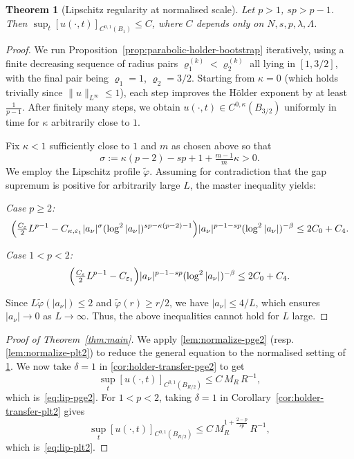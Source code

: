 \documentclass[11pt, a4paper, twoside]{article}
\newtheorem{theorem}{Theorem}[section]
\theoremstyle{definition}
\theoremstyle{remark}
\begin{document}
\begin{theorem}[Lipschitz regularity at normalised scale]
\label{thm:parabolic-lipschitz}
Let $p > 1$, $sp > p-1$. Then
$\sup_t[u(\cdot,t)]_{C^{0,1}(B_1)} \le C$, where $C$ depends only on $N, s, p, \lambda, \Lambda$.
\end{theorem}

\begin{proof}
We run Proposition~\ref{prop:parabolic-holder-bootstrap} iteratively, using a finite decreasing sequence of radius pairs $\varrho_1^{(k)} < \varrho_2^{(k)}$ all lying in $[1, 3/2]$, with the final pair being $\varrho_1 = 1$, $\varrho_2 = 3/2$. Starting from $\kappa = 0$ (which holds trivially since $\|u\|_{L^\infty} \le 1$), each step improves the H\"{o}lder exponent by at least $\tfrac{1}{p-1}$. After finitely many steps, we obtain $u(\cdot,t) \in C^{0,\kappa}(B_{3/2})$ uniformly in time for $\kappa$ arbitrarily close to $1$.

Fix $\kappa < 1$ sufficiently close to $1$ and $m$ as chosen above so that
\[
  \sigma := \kappa(p-2) - sp + 1 + \tfrac{m-1}{m}\kappa > 0.
\]
We employ the Lipschitz profile $\tilde\varphi$. Assuming for contradiction that the gap supremum is positive for arbitrarily large $L$, the master inequality yields:

\smallskip
\noindent\textit{Case $p \ge 2$:}
\begin{align*}
  \Bigl(\tfrac{C_\varepsilon}{2}L^{p-1}
  - C_{\kappa,\varepsilon_1}
    |a_\nu|^{\sigma}
    (\log^2|a_\nu|)^{sp-\kappa(p-2)-1}
  \Bigr)
  |a_\nu|^{p-1-sp}(\log^2|a_\nu|)^{-\beta}
  \le 2C_0 + C_4.
\end{align*}

\noindent\textit{Case $1 < p < 2$:}
\begin{align*}
  \Bigl(\tfrac{C_\varepsilon}{2}L^{p-1}
  - C_{\varepsilon_1}
  \Bigr)
  |a_\nu|^{p-1-sp}(\log^2|a_\nu|)^{-\beta}
  \le 2C_0 + C_4.
\end{align*}

\smallskip
Since $L\tilde\varphi(|a_\nu|) \le 2$ and $\tilde\varphi(r) \ge r/2$, we have $|a_\nu| \le 4/L$, which ensures $|a_\nu| \to 0$ as $L \to \infty$. Thus, the above inequalities cannot hold for $L$ large. 
\end{proof}


\begin{proof}[Proof of Theorem~\ref{thm:main}]

We apply \cref{lem:normalize-pge2} (resp.\cref{lem:normalize-plt2}) to reduce the
general equation to the normalised setting of \cref{thm:parabolic-lipschitz}. We now take
$\delta = 1$ in \cref{cor:holder-transfer-pge2} to get
\[
  \sup_t [u(\cdot,t)]_{C^{0,1}(B_{R/2})} \le C\,M_R\,R^{-1},
\]
which is~\eqref{eq:lip-pge2}. For $1 < p < 2$, taking $\delta = 1$ in
Corollary~\ref{cor:holder-transfer-plt2} gives
\[
  \sup_t [u(\cdot,t)]_{C^{0,1}(B_{R/2})}
  \le C\,M_R^{1+\frac{2-p}{sp}}\,R^{-1},
\]
which is~\eqref{eq:lip-plt2}. 
\end{proof}
\end{document}
